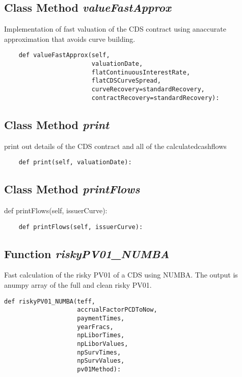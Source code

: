 \documentclass[twoside,11pt]{book}
\begin{document}
\subsection{Class Method {\it valueFastApprox}}
Implementation of fast valuation of the CDS contract using anaccurate approximation that avoids curve building. 

\begin{lstlisting}
    def valueFastApprox(self,
                        valuationDate,
                        flatContinuousInterestRate,
                        flatCDSCurveSpread,
                        curveRecovery=standardRecovery,
                        contractRecovery=standardRecovery):
\end{lstlisting}

\subsection{Class Method {\it print}}
print out details of the CDS contract and all of the calculatedcashflows 

\begin{lstlisting}
    def print(self, valuationDate):
\end{lstlisting}

\subsection{Class Method {\it printFlows}}
def printFlows(self, issuerCurve):

\begin{lstlisting}
    def printFlows(self, issuerCurve):
\end{lstlisting}

\subsection{Function {\it riskyPV01\_NUMBA}}
Fast calculation of the risky PV01 of a CDS using NUMBA. The output is anumpy array of the full and clean risky PV01.

\begin{lstlisting}
def riskyPV01_NUMBA(teff,
                    accrualFactorPCDToNow,
                    paymentTimes,
                    yearFracs,
                    npLiborTimes,
                    npLiborValues,
                    npSurvTimes,
                    npSurvValues,
                    pv01Method):
\end{lstlisting}
\end{document}
